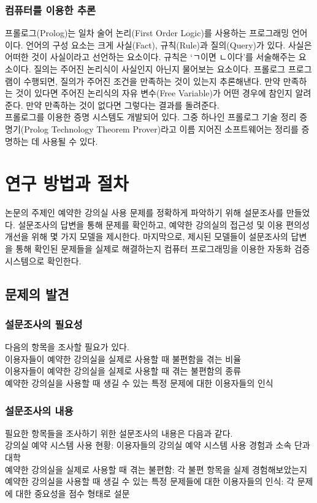 \documentclass[11pt,a4paper]{article}
\begin{document}
\subsubsection{컴퓨터를 이용한 추론}
프롤로그(Prolog)는 일차 술어 논리(First Order Logic)를 사용하는 프로그래밍 언어이다. 언어의 구성 요소는 크게 사실(Fact), 규칙(Rule)과 질의(Query)가 있다. 사실은 어떠한 것이 사실이라고 선언하는 요소이다. 규칙은 ‘ㄱ이면 ㄴ이다’를 서술해주는 요소이다. 질의는 주어진 논리식이 사실인지 아닌지 물어보는 요소이다. 프롤로그 프로그램이 수행되면, 질의가 주어진 조건을 만족하는 것이 있는지 추론해낸다. 만약 만족하는 것이 있다면 주어진 논리식의 자유 변수(Free Variable)가 어떤 경우에 참인지 알려준다. 만약 만족하는 것이 없다면 그렇다는 결과를 돌려준다.\\
프롤로그를 이용한 증명 시스템도 개발되어 있다. 그중 하나인 프롤로그 기술 정리 증명기(Prolog Technology Theorem Prover)라고 이름 지어진 소프트웨어는 정리를 증명하는 데 사용될 수 있다.

\section{연구 방법과 절차}
논문의 주제인 예약한 강의실 사용 문제를 정확하게 파악하기 위해 설문조사를 만들었다. 설문조사의 답변을 통해 문제를 확인하고, 예약한 강의실의 접근성 및 이용 편의성 개선을 위해 몇 가지 모델을 제시한다. 마지막으로, 제시된 모델들이 설문조사의 답변을 통해 확인된 문제들을 실제로 해결하는지 컴퓨터 프로그래밍을 이용한 자동화 검증 시스템으로 확인한다.

\subsection{문제의 발견}

\subsubsection{설문조사의 필요성}
다음의 항목을 조사할 필요가 있다.\\
이용자들이 예약한 강의실을 실제로 사용할 때 불편함을 겪는 비율\\
이용자들이 예약한 강의실을 실제로 사용할 때 겪는 불편함의 종류\\
예약한 강의실을 사용할 때 생길 수 있는 특정 문제에 대한 이용자들의 인식

\subsubsection{설문조사의 내용}
필요한 항목들을 조사하기 위한 설문조사의 내용은 다음과 같다.\\
강의실 예약 시스템 사용 현황: 이용자들의 강의실 예약 시스템 사용 경험과 소속 단과대학\\
예약한 강의실을 실제로 사용할 때 겪는 불편함: 각 불편 항목을 실제 경험해보았는지\\
예약한 강의실을 사용할 때 생길 수 있는 특정 문제들에 대한 이용자들의 인식: 각 문제에 대한 중요성을 점수 형태로 설문
\end{document}
